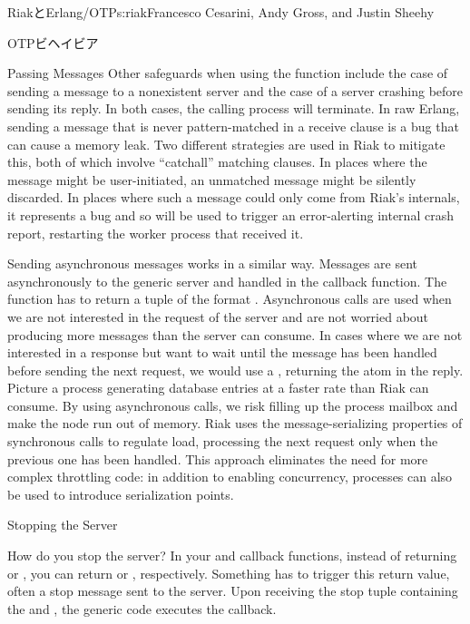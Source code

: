 \begin{aosachapter}{RiakとErlang/OTP}{s:riak}{Francesco Cesarini, Andy Gross, and Justin Sheehy}
\begin{aosasect1}{OTPビヘイビア}
\begin{aosasect2}{Passing Messages}
Other safeguards when using the  function
include the case of sending a message to a nonexistent server and
the case of a server crashing before sending its reply. In
both cases, the calling process will terminate. In raw Erlang, sending
a message that is never pattern-matched in a receive clause is a bug
that can cause a memory leak. Two different strategies are used in
Riak to mitigate this, both of which involve ``catchall'' matching
clauses.  In places where the message might be user-initiated, an
unmatched message might be silently discarded.  In places where such a
message could only come from Riak's internals, it represents a bug and
so will be used to trigger an error-alerting internal crash report,
restarting the worker process that received it.

Sending asynchronous messages works in a similar way. Messages are
sent asynchronously to the generic server and handled in the
 callback function. The function has to return a
tuple of the format . Asynchronous calls are
used when we are not interested in the request of the server and are
not worried about producing more messages than the server can
consume. In cases where we are not interested in a response but want
to wait until the message has been handled before sending the next
request, we would use a , returning the atom
 in the reply. Picture a process generating database entries
at a faster rate than Riak can consume. By using asynchronous calls,
we risk filling up the process mailbox and make the node run out of
memory.  Riak uses the message-serializing properties of synchronous
 calls to regulate load, processing the next request
only when the previous one has been handled.  This approach eliminates
the need for more complex throttling code: in addition to enabling
concurrency,  processes can also be used to
introduce serialization points.

\end{aosasect2}

\begin{aosasect2}{Stopping the Server}

How do you stop the server? In your  and
 callback functions, instead of returning
 or , you
can return  or , respectively. Something has to trigger this
return value, often a stop message sent to the server. Upon
receiving the stop tuple containing the  and
, the generic code executes the  callback.


\end{aosasect2}
\end{aosasect1}
\end{aosachapter}

